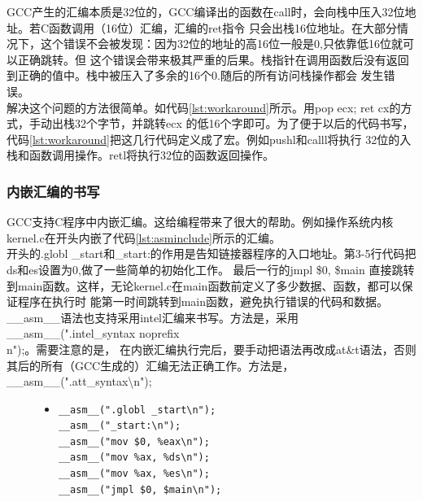 \documentclass[a4paper]{article}
\begin{document}
    GCC产生的汇编本质是32位的，GCC编译出的函数在call时，会向栈中压入32位地址。若C函数调用（16位）汇编，汇编的ret指令
    只会出栈16位地址。在大部分情况下，这个错误不会被发现：因为32位的地址的高16位一般是0,只依靠低16位就可以正确跳转。但
    这个错误会带来极其严重的后果。栈指针在调用函数后没有返回到正确的值中。栈中被压入了多余的16个0.随后的所有访问栈操作都会
    发生错误。\\
    
    解决这个问题的方法很简单。如代码\ref{lst:workaround}所示。用pop ecx; ret cx的方式，手动出栈32个字节，并跳转ecx
    的低16个字即可。为了便于以后的代码书写，代码\ref{lst:workaround}把这几行代码定义成了宏。例如pushl和calll将执行
    32位的入栈和函数调用操作。retl将执行32位的函数返回操作。
    \subsubsection{内嵌汇编的书写}\label{subsec:inlineasm}
    GCC支持C程序中内嵌汇编。这给编程带来了很大的帮助。例如操作系统内核kernel.c在开头内嵌了代码\ref{lst:asminclude}所示的汇编。\\
    
    开头的.globl \_start和\_start:的作用是告知链接器程序的入口地址。第3-5行代码把ds和es设置为0,做了一些简单的初始化工作。
    最后一行的jmpl \$0, \$main 直接跳转到main函数。这样，无论kernel.c在main函数前定义了多少数据、函数，都可以保证程序在执行时
    能第一时间跳转到main函数，避免执行错误的代码和数据。\\
    
    \_\_asm\_\_语法也支持采用intel汇编来书写。方法是，采用\_\_asm\_\_(".intel\_syntax noprefix\\n");。需要注意的是，
    在内嵌汇编执行完后，要手动把语法再改成at\&t语法，否则其后的所有（GCC生成的）汇编无法正确工作。方法是，\_\_asm\_\_(".att\_syntax\textbackslash n");

    \begin{figure}[!hbt]
    \begin{itemize}
    \item[] \begin{lstlisting}[language={[x86masm]Assembler}, label=lst:asminclude, caption=kernel.c文件头包含的内嵌汇编]
__asm__(".globl _start\n");
__asm__("_start:\n");
__asm__("mov $0, %eax\n");
__asm__("mov %ax, %ds\n");
__asm__("mov %ax, %es\n");
__asm__("jmpl $0, $main\n");
    \end{lstlisting}
    \end{itemize}
    \end{figure}
\end{document}
